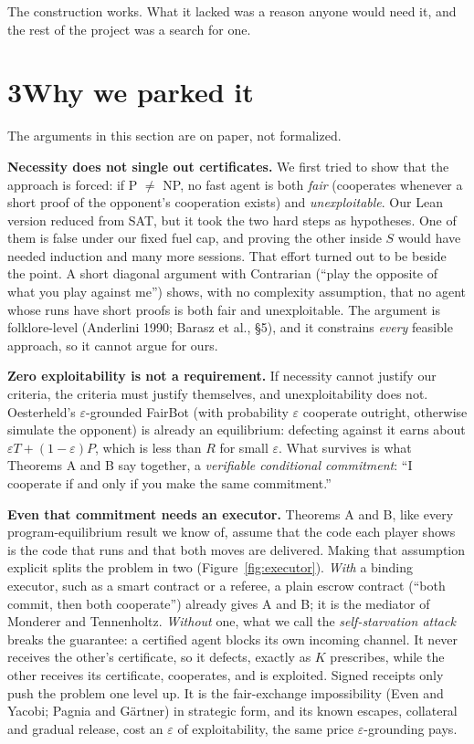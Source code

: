\documentclass[11pt]{article}
\begin{document}
The construction works. What it lacked was a reason anyone would need it, and the rest of the project was a search for one.

\section*{3\quad Why we parked it}

The arguments in this section are on paper, not formalized.

\textbf{Necessity does not single out certificates.} We first tried to show that the approach is forced: if P $\neq$ NP, no fast agent is both \emph{fair} (cooperates whenever a short proof of the opponent's cooperation exists) and \emph{unexploitable}. Our Lean version reduced from SAT, but it took the two hard steps as hypotheses. One of them is false under our fixed fuel cap, and proving the other inside $S$ would have needed induction and many more sessions. That effort turned out to be beside the point. A short diagonal argument with Contrarian (``play the opposite of what you play against me'') shows, with no complexity assumption, that no agent whose runs have short proofs is both fair and unexploitable. The argument is folklore-level (Anderlini 1990; Barasz et al., \S5), and it constrains \emph{every} feasible approach, so it cannot argue for ours.

\textbf{Zero exploitability is not a requirement.} If necessity cannot justify our criteria, the criteria must justify themselves, and unexploitability does not. Oesterheld's $\varepsilon$-grounded FairBot (with probability $\varepsilon$ cooperate outright, otherwise simulate the opponent) is already an equilibrium: defecting against it earns about $\varepsilon T + (1-\varepsilon)P$, which is less than $R$ for small $\varepsilon$. What survives is what Theorems A and B say together, a \emph{verifiable conditional commitment}: ``I cooperate if and only if you make the same commitment.''

\textbf{Even that commitment needs an executor.} Theorems A and B, like every program-equilibrium result we know of, assume that the code each player shows is the code that runs and that both moves are delivered. Making that assumption explicit splits the problem in two (Figure~\ref{fig:executor}). \emph{With} a binding executor, such as a smart contract or a referee, a plain escrow contract (``both commit, then both cooperate'') already gives A and B; it is the mediator of Monderer and Tennenholtz. \emph{Without} one, what we call the \emph{self-starvation attack} breaks the guarantee: a certified agent blocks its own incoming channel. It never receives the other's certificate, so it defects, exactly as $K$ prescribes, while the other receives its certificate, cooperates, and is exploited. Signed receipts only push the problem one level up. It is the fair-exchange impossibility (Even and Yacobi; Pagnia and Gärtner) in strategic form, and its known escapes, collateral and gradual release, cost an $\varepsilon$ of exploitability, the same price $\varepsilon$-grounding pays.
\end{document}
